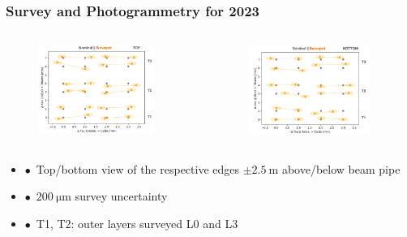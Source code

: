 \documentclass[aspectratio=1610, 12pt, xcolor=dvipsnames]{beamer}
\begin{document}
\begin{frame}\frametitle{Survey and Photogrammetry for 2023}
  \begin{columns}
    \begin{column}[c]{0.48\textwidth}
      \begin{figure}
        \includegraphics[width=0.9\textwidth]{plots/survey_top.png}
      \end{figure}
    \end{column}
    \begin{column}[c]{0.48\textwidth}
      \begin{figure}
        \includegraphics[width=0.9\textwidth]{plots/survey_bottom.png}
      \end{figure}
    \end{column}
  \end{columns}
  \begin{itemize}
    \item $\bullet$\, Top/bottom view of the respective edges $\pm \SI{2.5}{\m}$ above/below beam pipe
    \item $\bullet$\, $\SI{200}{\micro\m}$ survey uncertainty
    \item $\bullet$\, T1, T2: outer layers surveyed \to L0 and L3
  \end{itemize}
\end{frame}
\end{document}
